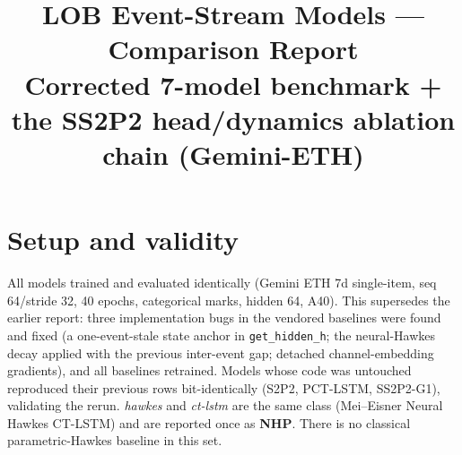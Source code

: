\documentclass[11pt]{article}
\title{\textbf{LOB Event-Stream Models --- Comparison Report}\\[2pt]
\large Corrected 7-model benchmark + the SS2P2 head/dynamics ablation chain (Gemini-ETH)}
\author{}\date{}
\begin{document}
\maketitle\vspace{-2.8em}

\section{Setup and validity}
All models trained and evaluated identically (Gemini ETH 7d single-item, seq 64/stride 32, 40 epochs,
categorical marks, hidden 64, A40). This supersedes the earlier report: three implementation bugs in the
vendored baselines were found and fixed (a one-event-stale state anchor in \texttt{get\_hidden\_h}; the
neural-Hawkes decay applied with the previous inter-event gap; detached channel-embedding gradients), and
all baselines retrained. Models whose code was untouched reproduced their previous rows bit-identically
(S2P2, PCT-LSTM, SS2P2-G1), validating the rerun. \emph{hawkes} and \emph{ct-lstm} are the same class
(Mei--Eisner Neural Hawkes CT-LSTM) and are reported once as \textbf{NHP}. There is no classical
parametric-Hawkes baseline in this set.
\end{document}
